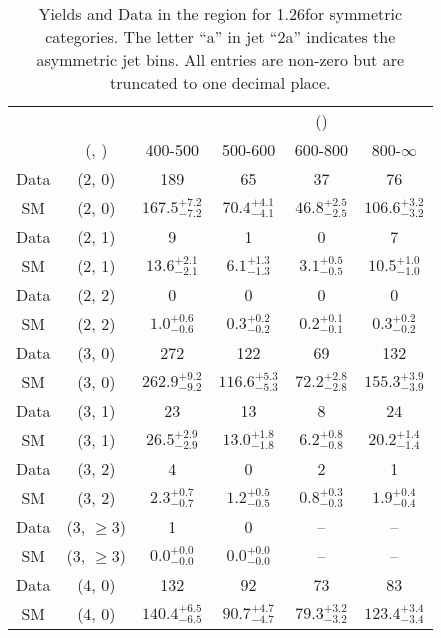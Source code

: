 \begin{table}[h!]
\tiny
\centering
\caption{Yields and Data in the \gj region for 1.26\ifb for symmetric categories. The letter ``a'' in jet \eg ``2a''  indicates the asymmetric jet bins. All entries are non-zero but are truncated to one decimal place.\label{tab:yieldsall_gj_comb_sym}}
\begin{tabular}
{cccccc}
	\hline\hline
&	&	& \multicolumn{4}{c}{\scalht (\gev)}\\ 
	&	 (\njet, \nb) & 400-500 & 500-600 & 600-800 & 800-$\infty$ \\ [0.8ex] 
\hline
	Data & (2, 0) & 189 & 65 & 37 & 76 \\[0.5ex] 
	SM & (2, 0) & $167.5^{+ 7.2 }_{- 7.2 }$ & $70.4^{+ 4.1 }_{- 4.1 }$ & $46.8^{+ 2.5 }_{- 2.5 }$ & $106.6^{+ 3.2 }_{- 3.2 }$ \\[0.5ex] 
	Data & (2, 1) & 9 & 1 & 0 & 7 \\[0.5ex] 
	SM & (2, 1) & $13.6^{+ 2.1 }_{- 2.1 }$ & $6.1^{+ 1.3 }_{- 1.3 }$ & $3.1^{+ 0.5 }_{- 0.5 }$ & $10.5^{+ 1.0 }_{- 1.0 }$ \\[0.5ex] 
	Data & (2, 2) & 0 & 0 & 0 & 0 \\[0.5ex] 
	SM & (2, 2) & $1.0^{+ 0.6 }_{- 0.6 }$ & $0.3^{+ 0.2 }_{- 0.2 }$ & $0.2^{+ 0.1 }_{- 0.1 }$ & $0.3^{+ 0.2 }_{- 0.2 }$ \\[0.5ex] 
	Data & (3, 0) & 272 & 122 & 69 & 132 \\[0.5ex] 
	SM & (3, 0) & $262.9^{+ 9.2 }_{- 9.2 }$ & $116.6^{+ 5.3 }_{- 5.3 }$ & $72.2^{+ 2.8 }_{- 2.8 }$ & $155.3^{+ 3.9 }_{- 3.9 }$ \\[0.5ex] 
	Data & (3, 1) & 23 & 13 & 8 & 24 \\[0.5ex] 
	SM & (3, 1) & $26.5^{+ 2.9 }_{- 2.9 }$ & $13.0^{+ 1.8 }_{- 1.8 }$ & $6.2^{+ 0.8 }_{- 0.8 }$ & $20.2^{+ 1.4 }_{- 1.4 }$ \\[0.5ex] 
	Data & (3, 2) & 4 & 0 & 2 & 1 \\[0.5ex] 
	SM & (3, 2) & $2.3^{+ 0.7 }_{- 0.7 }$ & $1.2^{+ 0.5 }_{- 0.5 }$ & $0.8^{+ 0.3 }_{- 0.3 }$ & $1.9^{+ 0.4 }_{- 0.4 }$ \\[0.5ex] 
	Data & (3, $\ge3$) & 1 & 0 & -- & -- \\[0.5ex] 
	SM & (3, $\ge3$) & $0.0^{+ 0.0 }_{- 0.0 }$ & $0.0^{+ 0.0 }_{- 0.0 }$ & -- & -- \\[0.5ex] 
	Data & (4, 0) & 132 & 92 & 73 & 83 \\[0.5ex] 
	SM & (4, 0) & $140.4^{+ 6.5 }_{- 6.5 }$ & $90.7^{+ 4.7 }_{- 4.7 }$ & $79.3^{+ 3.2 }_{- 3.2 }$ & $123.4^{+ 3.4 }_{- 3.4 }$ \\[0.5ex] 

\end{tabular}
\end{table}
